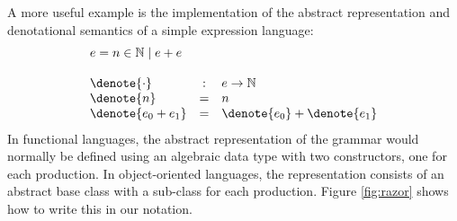 A more useful example is the implementation of the abstract representation and denotational semantics of a simple expression language:
\begin{displaymath}
\begin{array}{lcl}
\multicolumn{3}{l}{e = n \in \mathbb{N} \mid e+e} \\\\

\denote{\cdot} & : & e \to \mathbb{N}\\
\denote{n} & = & n \\
\denote{e_0+e_1} & = & \denote{e_0} + \denote{e_1}
\end{array}
\end{displaymath}
In functional languages, the abstract representation of the grammar would normally be defined using an algebraic data type with two constructors, one for each production. In object-oriented languages, the representation consists of an abstract base class with a sub-class for each production. Figure \ref{fig:razor} shows how to write this in our notation.
